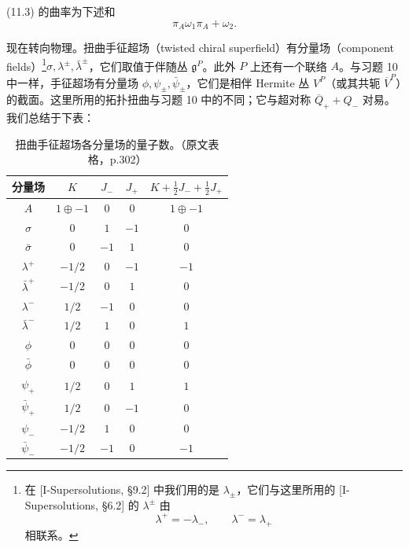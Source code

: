 (11.3) 的曲率为下述和
\begin{equation}
  \tag{11.5}
  \label{eq:sol11-5}
  \pi_A\omega_1\pi_A+\omega_2.
\end{equation}

现在转向物理。扭曲手征超场（twisted chiral superfield）有分量场（component fields）\footnote{%
在 [I-Supersolutions, §9.2] 中我们用的是 $\lambda_\pm$，它们与这里所用的 [I-Supersolutions, §6.2] 的 $\lambda^\pm$ 由
\[
  \lambda^+=-\lambda_-,\qquad \lambda^-=\lambda_+
\]
相联系。}$\sigma,\lambda^\pm,\bar\lambda^\pm$，它们取值于伴随丛 $\mathfrak{g}^P$。此外 $P$ 上还有一个联络 $A$。与习题 10 中一样，手征超场有分量场 $\phi,\psi_\pm,\bar\psi_\pm$，它们是相伴 Hermite 丛 $V^P$（或其共轭 $\overline{V}^P$）的截面。这里所用的拓扑扭曲与习题 10 中的不同；它与超对称 $\overline{Q}_++Q_-$ 对易。我们总结于下表：

\begin{table}[htbp]
  \centering
  \caption{扭曲手征超场各分量场的量子数。（原文表格，p.302）}
  \label{tab:p302}
  \renewcommand{\arraystretch}{1.18}
  \begin{tabular}{|c|c|c|c|c|}
    \hline
    分量场 & $K$ & $J_-$ & $J_+$ & $K+\frac12J_-+\frac12J_+$\\
    \hline\hline
    $A$ & $1\oplus-1$ & $0$ & $0$ & $1\oplus-1$\\
    \hline
    $\sigma$ & $0$ & $1$ & $-1$ & $0$\\
    \hline
    $\bar\sigma$ & $0$ & $-1$ & $1$ & $0$\\
    \hline
    $\lambda^+$ & $-1/2$ & $0$ & $-1$ & $-1$\\
    \hline
    $\bar\lambda^+$ & $-1/2$ & $0$ & $1$ & $0$\\
    \hline
    $\lambda^-$ & $1/2$ & $-1$ & $0$ & $0$\\
    \hline
    $\bar\lambda^-$ & $1/2$ & $1$ & $0$ & $1$\\
    \hline
    $\phi$ & $0$ & $0$ & $0$ & $0$\\
    \hline
    $\bar\phi$ & $0$ & $0$ & $0$ & $0$\\
    \hline
    $\psi_+$ & $1/2$ & $0$ & $1$ & $1$\\
    \hline
    $\bar\psi_+$ & $1/2$ & $0$ & $-1$ & $0$\\
    \hline
    $\psi_-$ & $-1/2$ & $1$ & $0$ & $0$\\
    \hline
    $\bar\psi_-$ & $-1/2$ & $-1$ & $0$ & $-1$\\
    \hline
  \end{tabular}
\end{table}

